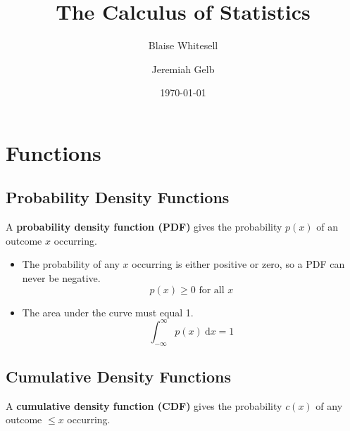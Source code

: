 \documentclass[12pt,letterpaper]{article}
\title{The Calculus of Statistics%
}
\author{Blaise Whitesell \and Jeremiah Gelb}
\date{\today}
\begin{document}
\newcommand{\bdef}[1]{\textbf{#1}} %
\newcommand{\dx}{\:\mathrm{d}x} %
\maketitle
\section{Functions} %
\subsection{Probability Density Functions}
A \bdef{probability density function (PDF)} gives the probability $p(x)$ of an outcome $x$ occurring.
\begin{itemize}
\item The probability of any $x$ occurring is either positive or zero, so a PDF can never be negative.
\begin{equation}
p(x) \geq 0 \text{ for all }x
\end{equation}
\item The area under the curve must equal 1.
\begin{equation}
\int_{-\infty}^\infty p(x)\dx = 1
\end{equation}
\end{itemize}
\subsection{Cumulative Density Functions}
A \bdef{cumulative density function (CDF)} gives the probability $c(x)$ of any outcome $\leq x$ occurring.
\end{document}
